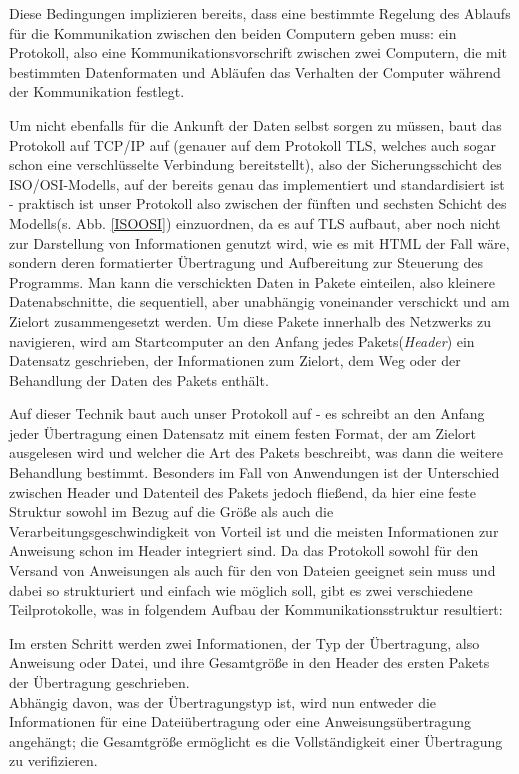 Diese Bedingungen implizieren bereits, dass eine bestimmte Regelung des Ablaufs für die Kommunikation zwischen den beiden Computern geben muss: ein Protokoll, also eine Kommunikationsvorschrift zwischen zwei Computern, die mit bestimmten Datenformaten und Abläufen das Verhalten der Computer während der Kommunikation festlegt.\par
Um nicht ebenfalls für die Ankunft der Daten selbst sorgen zu müssen, baut das Protokoll auf TCP/IP auf (genauer auf dem Protokoll TLS, welches auch sogar schon eine verschlüsselte Verbindung bereitstellt), also der Sicherungsschicht des ISO/OSI-Modells, auf der bereits genau das implementiert und standardisiert ist - praktisch ist unser Protokoll also zwischen der fünften und sechsten Schicht des Modells(s. Abb. \ref{ISOOSI}) einzuordnen, da es auf TLS aufbaut, aber noch nicht zur Darstellung von Informationen genutzt wird, wie es mit HTML der Fall wäre, sondern deren formatierter Übertragung und Aufbereitung zur Steuerung des Programms.
Man kann die verschickten Daten in Pakete einteilen, also kleinere Datenabschnitte, die sequentiell, aber unabhängig voneinander verschickt und am Zielort zusammengesetzt werden.
Um diese Pakete innerhalb des Netzwerks zu navigieren, wird am Startcomputer an den Anfang jedes Pakets(\textit{Header}) ein Datensatz geschrieben, der Informationen zum Zielort, dem Weg oder der Behandlung der Daten des Pakets enthält.\par 
Auf dieser Technik baut auch unser Protokoll auf - es schreibt an den Anfang jeder Übertragung einen Datensatz mit einem festen Format, der am Zielort ausgelesen wird und welcher die Art des Pakets beschreibt, was dann die weitere Behandlung bestimmt.
Besonders im Fall von Anwendungen ist der Unterschied zwischen Header und Datenteil des Pakets jedoch fließend, da hier eine feste Struktur sowohl im Bezug auf die Größe als auch die Verarbeitungsgeschwindigkeit von Vorteil ist und die meisten Informationen zur Anweisung schon im Header integriert sind.
Da das Protokoll sowohl für den Versand von Anweisungen als auch für den von Dateien geeignet sein muss und dabei so strukturiert und einfach wie möglich soll, gibt es zwei verschiedene Teilprotokolle, was in folgendem Aufbau der Kommunikationsstruktur resultiert:\par
Im ersten Schritt werden zwei Informationen, der Typ der Übertragung, also Anweisung oder Datei, und ihre Gesamtgröße in den Header des ersten Pakets der Übertragung geschrieben.\\
Abhängig davon, was der Übertragungstyp ist, wird nun entweder die Informationen für eine Dateiübertragung oder eine Anweisungsübertragung angehängt; die Gesamtgröße ermöglicht es die Vollständigkeit einer Übertragung zu verifizieren.

